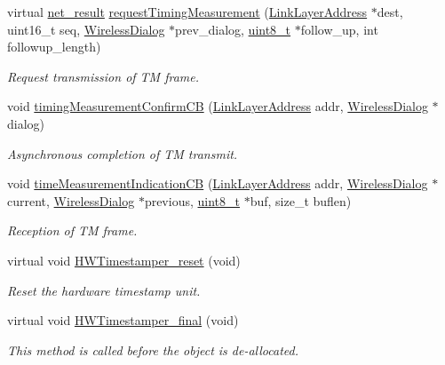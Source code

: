 \begin{DoxyCompactItemize}
virtual \hyperlink{avbts__osnet_8hpp_a21b2b4b5e479ef3adfc039ac30c961cd}{net\+\_\+result} \hyperlink{class_wireless_timestamper_a7647a2952736825775d90d6d5c5dca76}{request\+Timing\+Measurement} (\hyperlink{class_link_layer_address}{Link\+Layer\+Address} $\ast$dest, uint16\+\_\+t seq, \hyperlink{class_wireless_dialog}{Wireless\+Dialog} $\ast$prev\+\_\+dialog, \hyperlink{stdint_8h_aba7bc1797add20fe3efdf37ced1182c5}{uint8\+\_\+t} $\ast$follow\+\_\+up, int followup\+\_\+length)
\begin{DoxyCompactList}\small\item\em Request transmission of TM frame. \end{DoxyCompactList}\item 
void \hyperlink{class_wireless_timestamper_a8713624d1ec4485e5cd96df10248bbd2}{timing\+Measurement\+Confirm\+CB} (\hyperlink{class_link_layer_address}{Link\+Layer\+Address} addr, \hyperlink{class_wireless_dialog}{Wireless\+Dialog} $\ast$dialog)
\begin{DoxyCompactList}\small\item\em Asynchronous completion of TM transmit. \end{DoxyCompactList}\item 
void \hyperlink{class_wireless_timestamper_afc61326434c1980a7c3a814c7fc29c33}{time\+Measurement\+Indication\+CB} (\hyperlink{class_link_layer_address}{Link\+Layer\+Address} addr, \hyperlink{class_wireless_dialog}{Wireless\+Dialog} $\ast$current, \hyperlink{class_wireless_dialog}{Wireless\+Dialog} $\ast$previous, \hyperlink{stdint_8h_aba7bc1797add20fe3efdf37ced1182c5}{uint8\+\_\+t} $\ast$buf, size\+\_\+t buflen)
\begin{DoxyCompactList}\small\item\em Reception of TM frame. \end{DoxyCompactList}\item 
virtual void \hyperlink{class_common_timestamper_a1ee6bfcaf63bef07bbed1306e52e7203}{H\+W\+Timestamper\+\_\+reset} (void)
\begin{DoxyCompactList}\small\item\em Reset the hardware timestamp unit. \end{DoxyCompactList}\item 
virtual void \hyperlink{class_common_timestamper_a866fc2519a7b2a696e350ed05df53f90}{H\+W\+Timestamper\+\_\+final} (void)
\begin{DoxyCompactList}\small\item\em This method is called before the object is de-\/allocated. \end{DoxyCompactList}\item 

\end{DoxyCompactItemize}
